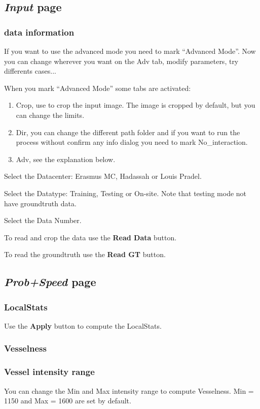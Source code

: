 \documentclass{article}
\begin{document}
\subsection{\emph{Input} page}
\subsubsection{data information}
If you want to use the advanced mode you need to mark ``Advanced Mode''. Now you can change wherever you want on the Adv tab, modify parameters, try differents cases...


When you mark ``Advanced Mode'' some tabs are activated:
\begin{enumerate}
  \item Crop, use to crop the input image. The image is cropped by default, but you can change the limits.
  \item Dir, you can change the different path folder and if you want to run the process without confirm any info dialog you need to mark No\_interaction.
  \item Adv, see the explanation below.
\end{enumerate}

Select the Datacenter: Erasmus MC, Hadassah or Louis Pradel.


Select the Datatype: Training, Testing or On-site. Note that testing mode not have groundtruth data.


Select the Data Number.


To read and crop the data use the {\bf Read Data} button.


To read the groundtruth use the {\bf Read GT} button.

\subsection{\emph{Prob+Speed} page}
\subsubsection{LocalStats}
Use the {\bf Apply} button to compute the LocalStats.
\subsubsection{Vesselness}
\subsubsection{Vessel intensity range}
You can change the Min and Max intensity range to compute Vesselness. Min = 1150 and Max = 1600 are set by default.
\end{document}
